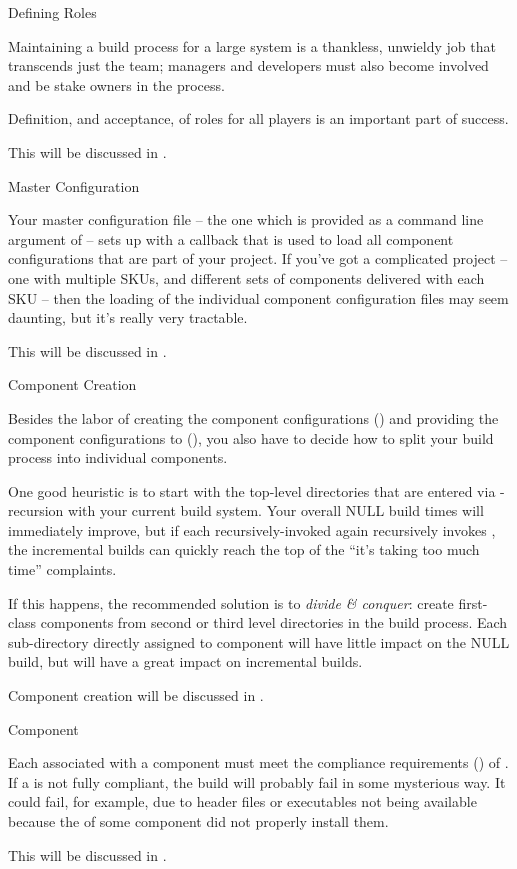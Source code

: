 \begin{description}
\item Defining Roles

  Maintaining a build process for a large system is a thankless,
  unwieldy job that transcends just the \bni team; managers and
  developers must also become involved and be stake owners in the
  process.

  Definition, and acceptance, of roles for all players is an important
  part of success.

  This will be discussed in .

\item Master Configuration

  Your master configuration file -- the one which is provided as a
  command line argument of \lmsbw -- sets up \lmsbw with a callback
  that is used to load all component configurations that are part of
  your project.  If you've got a complicated project -- one with
  multiple SKUs, and different sets of components delivered with each
  SKU -- then the loading of the individual component configuration
  files may seem daunting, but it's really very tractable.

  This will be discussed in .

\item Component Creation


  Besides the labor of creating the component configurations
  () and providing the component
  configurations to \lmsbw (), you also have to
  decide how to split your build process into individual components.

  One good heuristic is to start with the top-level directories that
  are entered via \make-recursion with your current build system.
  Your overall NULL build times will immediately improve, but if each
  recursively-invoked \makefile again recursively invokes \make, the
  incremental builds can quickly reach the top of the ``it's taking
  too much time'' complaints.

  If this happens, the recommended solution is to \emph{divide \&
    conquer}: create first-class components from second or third level
  directories in the build process.  Each sub-directory directly
  assigned to component will have little impact on the NULL build, but
  will have a great impact on incremental builds.

  Component creation will be discussed in
  .

\item Component \makefile

  Each \makefile associated with a component must meet the compliance
  requirements () of \lmsbw.  If a
  \makefile is not fully compliant, the build will probably fail in
  some mysterious way.  It could fail, for example, due to header
  files or executables not being available because the \makefile of
  some component did not properly install them.

  This will be discussed in .

\end{description}

